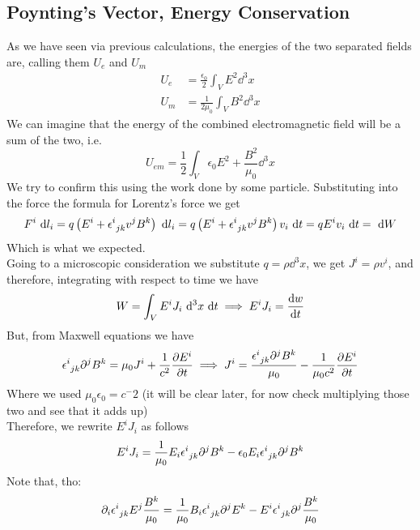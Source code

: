 \documentclass[../electromagnetism]{subfiles}
\begin{document}
\subsection{Poynting's Vector, Energy Conservation}
As we have seen via previous calculations, the energies of the two separated fields are, calling them $U_e$ and $U_m$
\begin{equation}
	\begin{aligned}
		U_e&=\frac{\epsilon_0}{2}\int_VE^2\dd^3x\\
		U_m&=\frac{1}{2\mu_0}\int_VB^2\dd^3x
	\end{aligned}
	\label{eq:fieldenergies}
\end{equation}
We can imagine that the energy of the combined electromagnetic field will be a sum of the two, i.e.
\begin{equation}
	U_{em}=\frac{1}{2}\int_V\epsilon_0E^2+\frac{B^2}{\mu_0}\dd^3x
	\label{eq:emfieldenergy}
\end{equation}
We try to confirm this using the work done by some particle. Substituting into the force the formula for Lorentz's force we get
\begin{equation*}
	F^i\ \mathrm{d} l_i=q\left( E^i+\epsilon^{i}_{\ jk}v^jB^k \right)\ \mathrm{d} l_i=q\left( E^i+\epsilon^{i}_{\ jk}v^jB^k \right)v_i\ \mathrm{d} t=qE^iv_i\ \mathrm{d} t=\ \mathrm{d} W
\end{equation*}
Which is what we expected.\\
Going to a microscopic consideration we substitute $q=\rho\dd^3x$, we get $J^i=\rho v^i$, and therefore, integrating with respect to time we have
\begin{equation*}
	W=\int_VE^iJ_i\ \mathrm{d}^3x\ \mathrm{d} t\implies E^iJ_i=\dv{w}{t}
\end{equation*}
But, from Maxwell equations we have
\begin{equation*}
	\epsilon^{i}_{\ jk}\partial^jB^k=\mu_0J^i+\frac{1}{c^2}\pdv{E^i}{t}\implies J^i=\frac{\epsilon^{i}_{\ jk}\partial^jB^k}{\mu_0}-\frac{1}{\mu_0c^2}\pdv{E^i}{t}
\end{equation*}
Where we used $\mu_0\epsilon_0=c^-2$ (it will be clear later, for now check multiplying those two and see that it adds up)\\
Therefore, we rewrite $E^iJ_i$ as follows
\begin{equation*}
	E^iJ_i=\frac{1}{\mu_0}E_i\epsilon^{i}_{\ jk}\partial^jB^k-\epsilon_0E_i\epsilon^{i}_{\ jk}\partial^jB^k
\end{equation*}
Note that, tho:
\begin{equation*}
	\partial_i\epsilon^{i}_{\ jk}E^j\frac{B^k}{\mu_0}=\frac{1}{\mu_0}B_i\epsilon^{i}_{\ jk}\partial^jE^k-E^i\epsilon^{i}_{\ jk}\partial^j\frac{B^k}{\mu_0}
\end{equation*}
\end{document}
